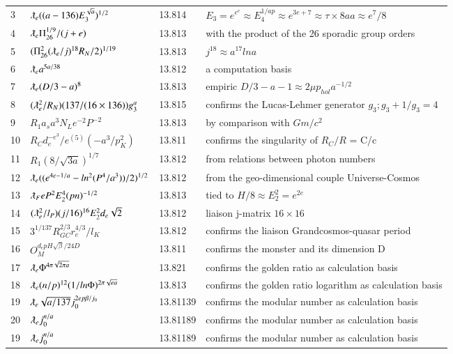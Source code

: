 \documentclass[a4paper,9pt]{article}
\begin{document}
\begin{table}
\begin{tabular}{llll}
   3 & $\lambdabar_{e} ((a-136)E_3^{\sqrt a})^{1/2}$ & 13.814 & $E_3 = e^{e^e} \approx E_4^{1/ap} \approx e^{3e+7}\approx \tau \times 8a a\approx e^7/8$ \\
   4 & $\lambdabar_{e} \Pi_{26}^{1/9}/(j+e)$ & 13.813 & with the product of the 26 sporadic group orders\\
   5 & $(\Pi_{26}^2(\lambdabar_e/j)^{18}R_N/2)^{1/19}$ & 13.813 & $j^{18} \approx a^{17} lna$\\
   6 & $\lambdabar_{e} a^{5a/38}$ & 13.812 & a computation basis\\
  7 & $\lambdabar_{e} (D/3 - a)^8$ & 13.813 & empiric $D/3 -a -1 \approx 2\mu p_{hol}a^{-1/2}$\\
   8 & $(\lambdabar_{e}^2/R_N) (137/(16 \times 136)) g_3^a$ & 13.815 & confirms the Lucas-Lehmer generator $g_3 ; g_3 +1/g_3 = 4$\\
   9 & $R_1 a_s a^3 N_L e^{-2}P^{-2}$ & 13.813 & by comparison with $Gm/c^2$\\
   10 & $R_C d_e^{-e^3}/e^{(5)}(-a^3/p_K^2)$ & 13.811 & confirms the singularity of $R_C/R$ = C/c\\
   11 & $R_1 (8/\sqrt{3a})^{1/7}$ & 13.812 & from relations between photon numbers \\
   12 & $\lambdabar_{e} ((e^{4e-1/a} - ln^2(P^4/a^3))/2)^{1/2}$ & 13.812 & from the geo-dimensional couple Universe-Cosmos\\
   13 & $\lambdabar_{F} e P^2E_2^4(pn)^{-1/2}$ & 13.813 &tied to $H/8 \approx E_2^2 = e^{2e}$\\
   14 & $(\lambdabar_{e}^2/l_P) (j/16)^{16}E_2^2 d_e \sqrt 2$ & 13.812 & liaison j-matrix $16 \times 16$\\
   15 & $3^{1/137} R_{GC}^{2/3} r_e^{4/3} /l_K$ & 13.812 & confirms the liaison Grandcosmos-quasar period\\
   16 & $O_M^{d_e pH\sqrt\beta / 24D}$ & 13.811 & confirms the monster and its dimension D\\
    17 & $\lambdabar_{e} \Phi ^{4\pi\sqrt{2\pi a}} $ & 13.821 & confirms the golden ratio as calculation basis\\   
    18 & $\lambdabar_{e} (n/p)^{12} (1/ln{\Phi}) ^{2\pi\sqrt{e a}} $ & 13.813 & confirms the golden ratio logarithm as calculation basis\\ 
   19 & $ \lambdabar_{e} \sqrt{a/137} j_0^{2ep\beta/j_0}$ & 13.81139 & confirms the modular number as calculation basis\\ 
   20 & $\lambdabar_{e} j_0^{n/a}$ & 13.81189 & confirms the modular number as calculation basis\\19 & $\lambdabar_{e} j_0^{n/a}$ & 13.81189 & confirms the modular number as calculation basis\\
   

\end{tabular}
\end{table}
\end{document}
